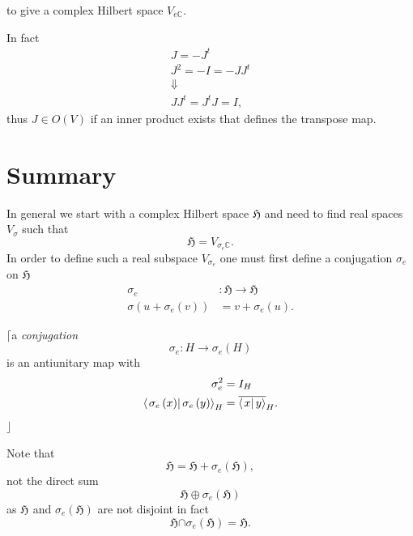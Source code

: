 \documentclass[aps,preprint]{revtex4}
\begin{document}
to give a complex Hilbert space $V_{e\mathbb{C}}.$

In fact 
\begin{gather}
J=-J^{t} \\
J^{2}=-I=-JJ^{t} \\
\Downarrow \\
JJ^{t}=J^{t}J=I,
\end{gather}%
thus $J\in O\left( V\right) $ if an inner product exists that defines the
transpose map.

\section{Summary}

In general we start with a complex Hilbert space $\mathfrak{H}$ and need to
find real spaces $V_{\sigma}$ such that 
\begin{equation}
\mathfrak{H}=V_{\sigma_{e}\mathbb{C}}.
\end{equation}
In order to define such a real subspace $V_{\sigma_{e}}$ one must first
define a conjugation $\sigma_{e}$ on $\mathfrak{H}$%
\begin{align}
\mathcal{\sigma}_{e} & :\mathfrak{H}\rightarrow\mathfrak{H} \\
\mathcal{\sigma}\left( u+\sigma_{e}\left( v\right) \right) &
=v+\sigma_{e}\left( u\right) .
\end{align}

$\lceil$a \emph{conjugation} 
\begin{equation}
\mathcal{\sigma}_{e}:H\rightarrow\mathcal{\sigma}_{e}\left( H\right)
\end{equation}
is an antiunitary map with 
\begin{align}
\mathcal{\sigma}_{e}^{2} & =I_{H} \\
\left\langle \left. \mathcal{\sigma}_{e}\left( x\right) \right\vert \mathcal{%
\sigma}_{e}\left( y\right) \right\rangle _{H} & =\overline {\left\langle
\left. x\right\vert y\right\rangle }_{H}.
\end{align}
$\rfloor$

Note that 
\begin{equation}
\mathfrak{H}=\mathfrak{H}+\mathcal{\sigma}_{e}\left( \mathfrak{H}\right) ,
\end{equation}
not the direct sum 
\begin{equation}
\mathfrak{H}\oplus\mathcal{\sigma}_{e}\left( \mathfrak{H}\right)
\end{equation}
as $\mathfrak{H\,}\mathcal{\ }$and $\mathcal{\sigma}_{e}\left( \mathfrak{H}%
\right) $ are not disjoint in fact 
\begin{equation}
\mathfrak{H}\mathcal{\cap\sigma}_{e}\left( \mathfrak{H}\right) =\mathfrak{H.}
\end{equation}
\end{document}
